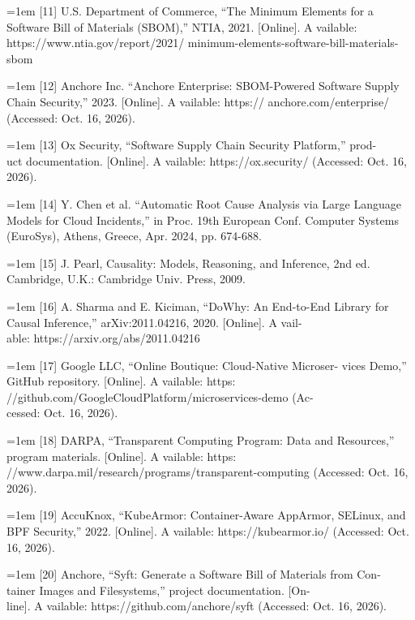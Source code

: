 \documentclass[conference]{IEEEtran}
\begin{document}
\par\noindent\hangindent=1em {[}11{]} U.S. Department of Commerce, ``The Minimum Elements for a Software Bill of Materials (SBOM),'' NTIA, 2021. {[}Online{]}. A vailable: https://www.ntia.gov/report/2021/ minimum-elements-software-bill-materials-sbom
\par\noindent\hangindent=1em {[}12{]} Anchore Inc. ``Anchore Enterprise: SBOM-Powered Software Supply Chain Security,'' 2023. {[}Online{]}. A vailable: https:// anchore.com/enterprise/ (Accessed: Oct. 16, 2026).
\par\noindent\hangindent=1em {[}13{]} Ox Security, ``Software Supply Chain Security Platform,'' prod-\\uct documentation. {[}Online{]}. A vailable: https://ox.security/ (Accessed: Oct. 16, 2026).
\par\noindent\hangindent=1em {[}14{]} Y. Chen et al. ``Automatic Root Cause Analysis via Large Language Models for Cloud Incidents,'' in Proc. 19th European Conf. Computer Systems (EuroSys), Athens, Greece, Apr. 2024, pp. 674-688.
\par\noindent\hangindent=1em {[}15{]} J. Pearl, Causality: Models, Reasoning, and Inference, 2nd ed. Cambridge, U.K.: Cambridge Univ. Press, 2009.
\par\noindent\hangindent=1em {[}16{]} A. Sharma and E. Kiciman, ``DoWhy: An End-to-End Library for Causal Inference,'' arXiv:2011.04216, 2020. {[}Online{]}. A vail-\\able: https://arxiv.org/abs/2011.04216
\par\noindent\hangindent=1em {[}17{]} Google LLC, ``Online Boutique: Cloud-Native Microser- vices Demo,'' GitHub repository. {[}Online{]}. A vailable: https: //github.com/GoogleCloudPlatform/microservices-demo (Ac-\\cessed: Oct. 16, 2026).
\par\noindent\hangindent=1em {[}18{]} DARPA, ``Transparent Computing Program: Data and Resources,'' program materials. {[}Online{]}. A vailable: https: //www.darpa.mil/research/programs/transparent-computing (Accessed: Oct. 16, 2026).
\par\noindent\hangindent=1em {[}19{]} AccuKnox, ``KubeArmor: Container-Aware AppArmor, SELinux, and BPF Security,'' 2022. {[}Online{]}. A vailable: https://kubearmor.io/ (Accessed: Oct. 16, 2026).
\par\noindent\hangindent=1em {[}20{]} Anchore, ``Syft: Generate a Software Bill of Materials from Con-\\tainer Images and Filesystems,'' project documentation. {[}On-\\line{]}. A vailable: https://github.com/anchore/syft (Accessed: Oct. 16, 2026).
\end{document}
